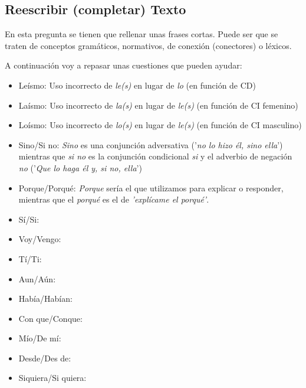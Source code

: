 \documentclass[arial,a4paper,print]{article}
\begin{document}
\pagebreak

\subsection{Reescribir (completar) Texto}
En esta pregunta se tienen que rellenar unas frases cortas. Puede ser que se traten de conceptos gramáticos, normativos, de conexión (conectores) o léxicos. 

A continuación voy a repasar unas cuestiones que pueden ayudar:
\begin{itemize}
	
\item Leísmo: Uso incorrecto de \textit{le(s)} en lugar de \textit{lo} (en función de CD)
\item Laísmo: Uso incorrecto de \textit{la(s)} en lugar de \textit{le(s)} (en función de CI femenino)
\item Loísmo: Uso incorrecto de \textit{lo(s)} en lugar de \textit{le(s)} (en función de CI masculino)
\item Sino/Si no: \textit{Sino} es una conjunción adversativa ('\textit{no lo hizo él, sino ella}') mientras que \textit{si no} es la conjunción condicional \textit{si} y el adverbio de negación \textit{no} ('\textit{Que lo haga él y, si no, ella}')
\item Porque/Porqué: \textit{Porque} sería el que utilizamos para explicar o responder, mientras que el \textit{porqué} es el de \textit{'explícame el porqué'}. 
\item Sí/Si: 
\item Voy/Vengo:
\item Tí/Ti:
\item Aun/Aún: 
\item Había/Habían:
\item Con que/Conque: 
\item Mío/De mí: 
\item Desde/Des de:
\item Siquiera/Si quiera:


	
\end{itemize}
	
\end{document}

